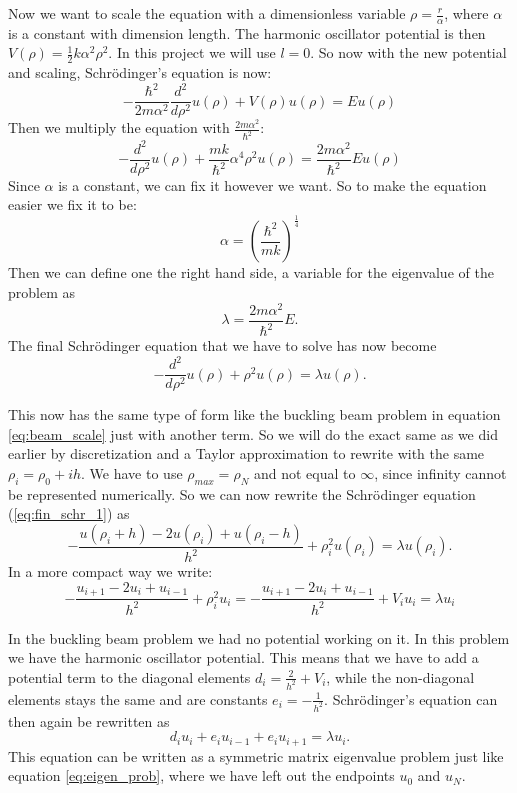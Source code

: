 \documentclass[12pt,a4paper,english]{article}
\begin{document}
Now we want to scale the equation with a dimensionless variable $\rho=\frac{r}{\alpha}$, where $\alpha$ is a constant with dimension length. The harmonic oscillator potential is then $V(\rho)=\frac{1}{2}k\alpha^2\rho^2$. In this project we will use $l=0$. So now with the new potential and scaling, Schrödinger's equation is now:
\begin{equation*}
-\frac{\hbar^2}{2m\alpha^2}\frac{d^2}{d\rho^2}u(\rho)+V(\rho)u(\rho)=Eu(\rho)
\end{equation*}
Then we multiply the equation with $\frac{2m\alpha^2}{\hbar^2}$:
\begin{equation*}
-\frac{d^2}{d\rho^2}u(\rho)+\frac{mk}{\hbar^2}\alpha^4\rho^2u(\rho)=\frac{2m\alpha^2}{\hbar^2}Eu(\rho)
\end{equation*}
Since $\alpha$ is a constant, we can fix it however we want. So to make the equation easier we fix it to be:
\[\alpha=\left(\frac{\hbar^2}{mk}\right)^{\frac{1}{4}}\]
Then we can define one the right hand side, a variable for the eigenvalue of the problem as 
\[\lambda=\frac{2m\alpha^2}{\hbar^2}E.\]
The final Schrödinger equation that we have to solve has now become
\begin{equation}
\label{eq:fin_schr_1}
-\frac{d^2}{d\rho^2}u(\rho)+\rho^2u(\rho)=\lambda u(\rho).
\end{equation}

This now has the same type of form like the buckling beam problem in equation \ref{eq:beam_scale} just with another term. So we will do the exact same as we did earlier by discretization and a Taylor approximation to rewrite with the same $\rho_i=\rho_0+ih$. We have to use $\rho_{max}=\rho_N$ and not equal to $\infty$, since infinity cannot be represented numerically. So we can now rewrite the Schrödinger equation (\ref{eq:fin_schr_1}) as 
\begin{equation*}
-\frac{u(\rho_i+h)-2u(\rho_i)+u(\rho_i-h)}{h^2}+\rho_i^2u(\rho_i)=\lambda u(\rho_i).
\end{equation*}
In a more compact way we write:
\begin{equation}
\label{eq:schr_discr_1}
-\frac{u_{i+1}-2u_i+u_{i-1}}{h^2}+\rho_i^2u_i=-\frac{u_{i+1}-2u_i+u_{i-1}}{h^2}+V_iu_i=\lambda u_i
\end{equation}

In the buckling beam problem we had no potential working on it. In this problem we have the harmonic oscillator potential. This means that we have to add a potential term to the diagonal elements $d_i=\frac{2}{h^2}+V_i$, while the non-diagonal elements stays the same and are constants $e_i=-\frac{1}{h^2}$. Schrödinger's equation can then again be rewritten as
\begin{equation}
\label{eq:schr_eigen_1}
d_iu_i+e_iu_{i-1}+e_iu_{i+1}=\lambda u_i.
\end{equation}
This equation can be written as a symmetric matrix eigenvalue problem just like equation \ref{eq:eigen_prob}, where we have left out the endpoints $u_0$ and $u_N$.
\end{document}
